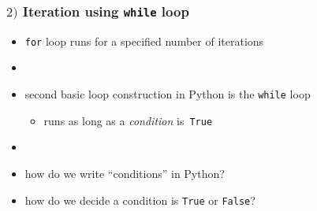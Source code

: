 \documentclass[english,14pt]{beamer}
\newcommand\red[1]{{\color{red} #1}}
\begin{document}
\begin{frame}[fragile]

\frametitle{$2)$ Iteration using \texttt{while} loop}

\begin{itemize}
	\item \texttt{for} loop runs for a specified number of iterations

	\item[]
	
	\item second basic loop construction in Python is the \texttt{while} loop
	\begin{itemize}
		\item runs as long as a \red{\emph{condition}} is~\texttt{True}
	\end{itemize}
	
	\item[]
	
	\item how do we write ``conditions'' in Python?
	\item how do we decide a condition is \texttt{True} or \texttt{False}?
\end{itemize}

\end{frame}

\end{document}
